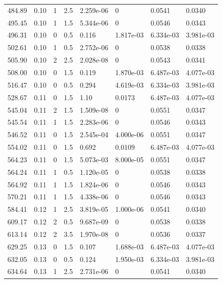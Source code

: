 \documentclass[preview]{standalone}
\begin{document}
{{{\begin{tabular}{L{1.2cm}C{1.2cm} C{0.3cm}C{0.5cm} C{1.4cm}C{1.4cm} C{1.4cm}C{1.4cm}}
  484.89  &  0.10  & 1     & 2.5 &  2.259e-06  & 0  & 0.0541 &  0.0340   \\ 
  495.45  &  0.10  & 1     & 1.5 &  5.344e-06  & 0  & 0.0546 &  0.0343   \\ 
  496.31  &  0.10  & 0     & 0.5 &  0.116  & 1.817e-03  & 6.334e-03 &  3.981e-03   \\ 
  502.61  &  0.10  & 1     & 0.5 &  2.752e-06  & 0  & 0.0538 &  0.0338   \\ 
  505.90  &  0.10  & 2     & 2.5 &  2.028e-08  & 0  & 0.0543 &  0.0341   \\ 
  508.00  &  0.10  & 0     & 1.5 &  0.119  & 1.870e-03  & 6.487e-03 &  4.077e-03   \\ 
  516.47  &  0.10  & 0     & 0.5 &  0.294  & 4.619e-03  & 6.334e-03 &  3.981e-03   \\ 
  528.67  &  0.11  & 0     & 1.5 &  1.10  & 0.0173  & 6.487e-03 &  4.077e-03   \\ 
  545.04  &  0.11  & 2     & 1.5 &  1.509e-08  & 0  & 0.0551 &  0.0347   \\ 
  545.54  &  0.11  & 1     & 1.5 &  2.283e-06  & 0  & 0.0546 &  0.0343   \\ 
  546.52  &  0.11  & 0     & 1.5 &  2.545e-04  & 4.000e-06  & 0.0551 &  0.0347   \\ 
  554.02  &  0.11  & 0     & 1.5 &  0.692  & 0.0109  & 6.487e-03 &  4.077e-03   \\ 
  564.23  &  0.11  & 0     & 1.5 &  5.073e-03  & 8.000e-05  & 0.0551 &  0.0347   \\ 
  564.24  &  0.11  & 1     & 0.5 &  1.120e-05  & 0  & 0.0538 &  0.0338   \\ 
  564.92  &  0.11  & 1     & 1.5 &  1.824e-06  & 0  & 0.0546 &  0.0343   \\ 
  570.21  &  0.11  & 1     & 1.5 &  4.338e-06  & 0  & 0.0546 &  0.0343   \\ 
  584.41  &  0.12  & 1     & 2.5 &  3.819e-05  & 1.000e-06  & 0.0541 &  0.0340   \\ 
  609.17  &  0.12  & 2     & 0.5 &  9.687e-09  & 0  & 0.0538 &  0.0338   \\ 
  613.14  &  0.12  & 2     & 3.5 &  1.970e-08  & 0  & 0.0536 &  0.0337   \\ 
  629.25  &  0.13  & 0     & 1.5 &  0.107  & 1.688e-03  & 6.487e-03 &  4.077e-03   \\ 
  632.05  &  0.13  & 0     & 0.5 &  0.124  & 1.950e-03  & 6.334e-03 &  3.981e-03   \\ 
  634.64  &  0.13  & 1     & 2.5 &  2.731e-06  & 0  & 0.0541 &  0.0340   \\ 

\end{tabular}}}}
\end{document}
